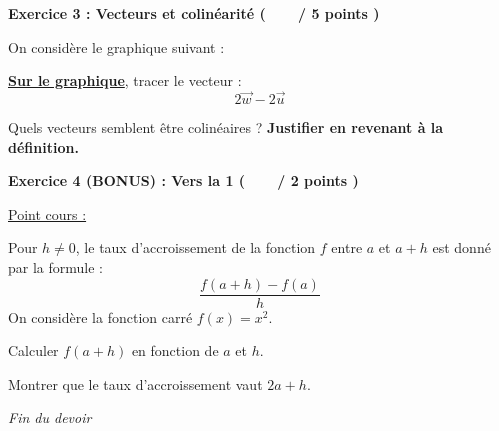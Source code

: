 \documentclass[12pt,a4paper]{exam}
\begin{document}
\vspace{10pt}

\noindent
\textbf{Exercice 3 : Vecteurs et colinéarité (\ \ \ \  / 5 points )}

\vspace{5pt}

On considère le graphique suivant : 

\begin{center}
\end{center}

\begin{questions}
    \question[3] \underline{\textbf{Sur le graphique}}, tracer le vecteur :
    \[2\overrightarrow{w}
    - 2\overrightarrow{u}\]

    \question[2] Quels vecteurs semblent être colinéaires ? \textbf{Justifier en revenant 
    à la définition.}
\end{questions}

\vspace{20pt}


\noindent
\textbf{Exercice 4 (BONUS) : Vers la 1 (\ \ \ \  / 2 points )}

\vspace{5pt}

\underline{Point cours :}
\vspace{5pt}

Pour $h \neq 0$, le taux d'accroissement de la fonction $f$ entre $a$ et $a + h$ est donné 
par la formule :
\[
\dfrac{f(a+h)-f(a)}{h}
\]
On considère la fonction carré $f(x) = x^2$.

\begin{questions}
    \question Calculer $f(a+h)$ en fonction de $a$ et $h$.

    \question Montrer que le taux d'accroissement vaut $2a + h$.
\end{questions}

\vspace{20pt}

\begin{center}
    \textit{Fin du devoir}
\end{center}
\end{document}
